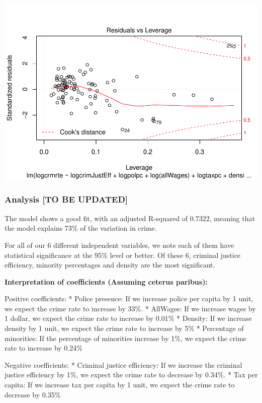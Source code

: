 \documentclass[]{article}
\begin{document}
\includegraphics{Bagnard_Gaustad_Hartman_Leung_Lab_3_files/figure-latex/unnamed-chunk-105-4.pdf}

\hypertarget{analysis-to-be-updated}{%
\subsubsection{Analysis {[}TO BE
UPDATED{]}}\label{analysis-to-be-updated}}

The model shows a good fit, with an adjusted R-squared of 0.7322,
meaning that the model explains 73\% of the variation in crime.

For all of our 6 different independent variables, we note each of them
have statistical significance at the 95\% level or better. Of these 6,
criminal justice efficiency, minority percentages and density are the
most significant.

\textbf{Interpretation of coefficients (Assuming ceterus paribus):}

Positive coefficients: * Police presence: If we increase police per
capita by 1 unit, we expect the crime rate to increase by 33\%. *
AllWages: If we increase wages by 1 dollar, we expect the crime rate to
increase by 0.01\% * Density: If we increase density by 1 unit, we
expect the crime rate to increase by 5\% * Percentage of minorities: If
the percentage of minorities increase by 1\%, we expect the crime rate
to increase by 0.24\%

Negative coefficients: * Criminal justice efficiency: If we increase the
criminal justice efficiency by 1\%, we expect the crime rate to decrease
by 0.34\%. * Tax per capita: If we increase tax per capita by 1 unit, we
expect the crime rate to decrease by 0.35\%
\end{document}
